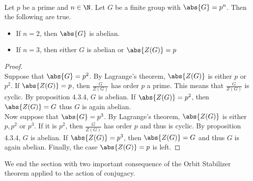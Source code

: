 \documentclass[a4paper]{article}
\begin{document}
\begin{crl}{}{}\\
Let $p$ be a prime and $n\in\N$. Let $G$ be a finite group with $\abs{G}=p^n$. Then the following are true. 
\begin{itemize}
\item If $n=2$, then $\abs{G}$ is abelian. 
\item If $n=3$, then either $G$ is abelian or $\abs{Z(G)}=p$
\end{itemize} 
\begin{proof}\\
Suppose that $\abs{G}=p^2$. By Lagrange's theorem, $\abs{Z(G)}$ is either $p$ or $p^2$. If $\abs{Z(G)}=p$, then $\frac{G}{Z(G)}$ has order $p$ a prime. This means that $\frac{G}{Z(G)}$ is cyclic. By proposition 4.3.4, $G$ is abelian. If $\abs{Z(G)}=p^2$, then $\abs{Z(G)}=G$ thus $G$ is again abelian. \\

Now suppose that $\abs{G}=p^3$. By Lagrange's theorem, $\abs{Z(G)}$ is either $p,p^2$ or $p^3$. If it is $p^2$, then $\frac{G}{Z(G)}$ has order $p$ and thus is cyclic. By proposition 4.3.4, $G$ is abelian. If $\abs{Z(G)}=p^3$, then $\abs{Z(G)}=G$ and thus $G$ is again abelian. Finally, the case $\abs{Z(G)}=p$ is left. 
\end{proof}
\end{crl}

We end the section with two important consequence of the Orbit Stabilizer theorem applied to the action of conjugacy. 
\end{document}
